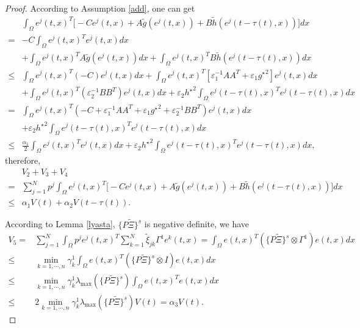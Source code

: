 \documentclass[review]{elsarticle}
\begin{document}
\begin{proof}
According to Assumption \ref{add}, one can get
\begin{align*}
&\int_{\Omega}e^j(t,x)^T\bigg[-Ce^j(t,x)+A\tilde{g}(e^j(t,x))+B\tilde{h}(e^j(t-\tau(t),x))\bigg]dx\\
=&-C\int_{\Omega}e^j(t,x)^Te^j(t,x)dx\\
&+\int_{\Omega}e^j(t,x)^TA\tilde{g}(e^j(t,x))dx+\int_{\Omega}e^j(t,x)^TB\tilde{h}(e^j(t-\tau(t),x))dx\\
\le&\int_{\Omega}e^j(t,x)^T(-C)e^j(t,x)dx+\int_{\Omega}e^j(t,x)^T[\varepsilon_1^{-1}AA^T+\varepsilon_1{g^{\star}}^2]e^j(t,x)dx\\
&+\int_{\Omega}e^j(t,x)^T(\varepsilon_2^{-1}BB^T)e^j(t,x)dx+\varepsilon_2{h^{\star}}^2\int_{\Omega}e^j(t-\tau(t),x)^Te^j(t-\tau(t),x)dx\\
=&\int_{\Omega}e^j(t,x)^T(-C+\varepsilon_1^{-1}AA^T+\varepsilon_1{g^{\star}}^2+\varepsilon_2^{-1}BB^T)e^j(t,x)dx\\
&+\varepsilon_2{h^{\star}}^2\int_{\Omega}e^j(t-\tau(t),x)^Te^j(t-\tau(t),x)dx\\
\le&\frac{\alpha_1}{2}\int_{\Omega}e^j(t,x)^Te^j(t,x)dx+\varepsilon_2{h^{\star}}^2\int_{\Omega}e^j(t-\tau(t),x)^Te^j(t-\tau(t),x)dx,
\end{align*}
therefore,
\begin{align}\label{v234}
&V_2+V_3+V_4\nonumber\\
=&\sum\limits_{j=1}^Np^j\int_{\Omega}e^j(t,x)^T\bigg[-Ce^j(t,x)+A\tilde{g}(e^j(t,x))+B\tilde{h}(e^j(t-\tau(t),x))\bigg]dx\nonumber\\
\le&\alpha_1V(t)+\alpha_2V(t-\tau(t)).
\end{align}

According to Lemma \ref{lyasta}, $\{P\tilde{\Xi}\}^s$ is negative definite, we have
\begin{align}\label{v5}
V_5=&\sum\limits_{j=1}^N\int_{\Omega}p^je^j(t,x)^T\sum\limits_{k=1}^N\tilde{\xi}_{jk}\Gamma^1
e^k(t,x)=\int_{\Omega}e(t,x)^T(\{P\tilde{\Xi}\}^s\otimes \Gamma^1)e(t,x)dx\nonumber\\
\le&\min_{k=1,\cdots,n}\gamma_k^1\int_{\Omega}e(t,x)^T(\{P\tilde{\Xi}\}^s\otimes I)e(t,x)dx\nonumber\\
\le&\min_{k=1,\cdots,n}\gamma_k^1\lambda_{\max}(\{P\tilde{\Xi}\}^s)\int_{\Omega}e(t,x)^Te(t,x)dx\nonumber\\
\le&2\min_{k=1,\cdots,n}\gamma_k^1\lambda_{\max}(\{P\tilde{\Xi}\}^s)V(t)=\alpha_3V(t).
\end{align}


\end{proof}
\end{document}
